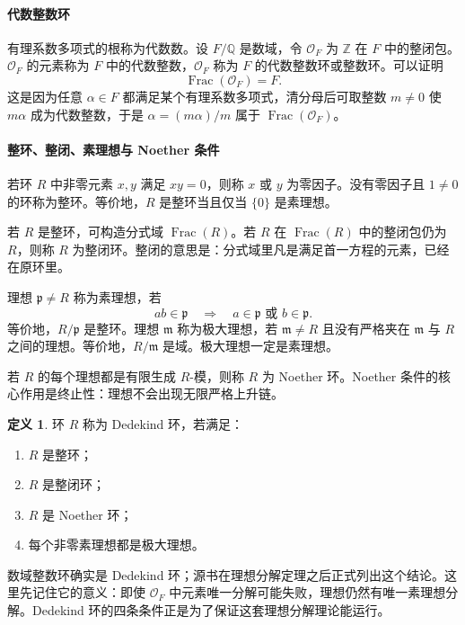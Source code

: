 \documentclass[11pt,a4paper,openany]{ctexbook}
\numberwithin{equation}{chapter}
\newcommand{\Q}{\mathbb{Q}}
\newcommand{\Z}{\mathbb{Z}}
\theoremstyle{plain}
\theoremstyle{definition}
\newtheorem{definition}[theorem]{定义}
\theoremstyle{remark}
\begin{document}
\paragraph{代数整数环}
有理系数多项式的根称为代数数。设 $F/\Q$ 是数域，令 $\mathcal O_F$ 为 $\Z$ 在 $F$ 中的整闭包。$\mathcal O_F$ 的元素称为 $F$ 中的代数整数，$\mathcal O_F$ 称为 $F$ 的代数整数环或整数环。可以证明
\[
\operatorname{Frac}(\mathcal O_F)=F.
\]
这是因为任意 $\alpha\in F$ 都满足某个有理系数多项式，清分母后可取整数 $m\ne0$ 使 $m\alpha$ 成为代数整数，于是 $\alpha=(m\alpha)/m$ 属于 $\operatorname{Frac}(\mathcal O_F)$。

\paragraph{整环、整闭、素理想与 Noether 条件}
若环 $R$ 中非零元素 $x,y$ 满足 $xy=0$，则称 $x$ 或 $y$ 为零因子。没有零因子且 $1\ne0$ 的环称为整环。等价地，$R$ 是整环当且仅当 $\{0\}$ 是素理想。

若 $R$ 是整环，可构造分式域 $\operatorname{Frac}(R)$。若 $R$ 在 $\operatorname{Frac}(R)$ 中的整闭包仍为 $R$，则称 $R$ 为整闭环。整闭的意思是：分式域里凡是满足首一方程的元素，已经在原环里。

理想 $\mathfrak p\ne R$ 称为素理想，若
\[
ab\in\mathfrak p\quad\Longrightarrow\quad a\in\mathfrak p\text{ 或 }b\in\mathfrak p.
\]
等价地，$R/\mathfrak p$ 是整环。理想 $\mathfrak m$ 称为极大理想，若 $\mathfrak m\ne R$ 且没有严格夹在 $\mathfrak m$ 与 $R$ 之间的理想。等价地，$R/\mathfrak m$ 是域。极大理想一定是素理想。

若 $R$ 的每个理想都是有限生成 $R$-模，则称 $R$ 为 Noether 环。Noether 条件的核心作用是终止性：理想不会出现无限严格上升链。

\begin{definition}
环 $R$ 称为 Dedekind 环，若满足：
\begin{enumerate}[label=(\arabic*)]
\item $R$ 是整环；
\item $R$ 是整闭环；
\item $R$ 是 Noether 环；
\item 每个非零素理想都是极大理想。
\end{enumerate}
\end{definition}

数域整数环确实是 Dedekind 环；源书在理想分解定理之后正式列出这个结论。这里先记住它的意义：即使 $\mathcal O_F$ 中元素唯一分解可能失败，理想仍然有唯一素理想分解。Dedekind 环的四条条件正是为了保证这套理想分解理论能运行。
\end{document}
